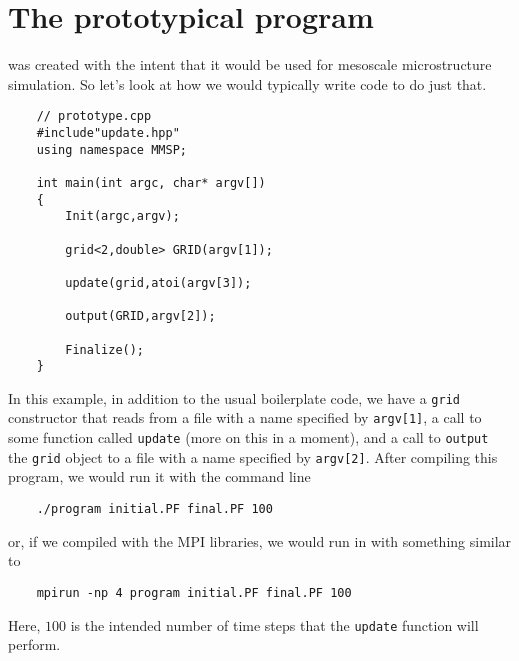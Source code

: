 \section{The prototypical \MMSP program}
\MMSP was created with the intent that it would be used for mesoscale microstructure simulation.  So let's look at how we would typically write code to do just that.
\begin{shadebox}
\begin{verbatim}
    // prototype.cpp
    #include"update.hpp"
    using namespace MMSP;

    int main(int argc, char* argv[])
    {
        Init(argc,argv);

        grid<2,double> GRID(argv[1]);

        update(grid,atoi(argv[3]);

        output(GRID,argv[2]);

        Finalize();
    }
\end{verbatim}
\end{shadebox}
In this example, in addition to the usual \MMSP boilerplate code, we have a {\tt grid} constructor that reads from a file with a name specified by {\tt argv[1]}, a call to some function called {\tt update} (more on this in a moment), and a call to {\tt output} the {\tt grid} object to a file with a name specified by {\tt argv[2]}. After compiling this program, we would run it with the command line
\begin{shadebox}
\begin{verbatim}
    ./program initial.PF final.PF 100
\end{verbatim}
\end{shadebox}
or, if we compiled with the MPI libraries, we would run in with something similar to
\begin{shadebox}
\begin{verbatim}
    mpirun -np 4 program initial.PF final.PF 100
\end{verbatim}
\end{shadebox}
Here, $100$ is the intended number of time steps that the {\tt update} function will perform.

